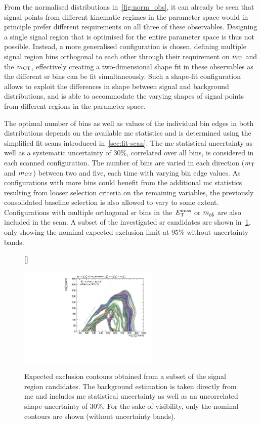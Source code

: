 From the normalised distributions in~\cref{fig:norm_obs}, it can already be seen that signal points from different kinematic regimes in the parameter space would in principle prefer different requirements on all three of these observables. Designing a single signal region that is optimised for the entire parameter space is thus not possible. Instead, a more generalised configuration is chosen, defining multiple signal region bins orthogonal to each other through their requirement on $m_{\textrm{T}}$ and the $m_{\textrm{CT}}$, effectively creating a two-dimensional shape fit in these observables as the different \gls{sr} bins can be fit simultaneously. Such a shape-fit configuration allows to exploit the differences in shape between signal and background distributions, and is able to accommodate the varying shapes of signal points from different regions in the parameter space.

The optimal number of bins as well as values of the individual bin edges in both distributions depends on the available \gls{mc} statistics and is determined using the simplified fit scans introduced in~\cref{sec:fit-scan}. The \gls{mc} statistical uncertainty as well as a systematic uncertainty of 30\%, correlated over all bins, is considered in each scanned configuration. The number of bins are varied in each direction ($m_{\textrm{T}}$ and $m_{\textrm{CT}}$) between two and five, each time with varying bin edge values. As configurations with more bins could benefit from the additional \gls{mc} statistics resulting from looser selection criteria on the remaining variables, the previously consolidated baseline selection is also allowed to vary to some extent. Configurations with multiple orthogonal \gls{sr} bins in the $E_{\textrm{T}}^{\textrm{miss}}$ or $m_{b\bar{b}}$ are also included in the scan. A subset of the investigated \gls{sr} candidates are shown in~\cref{fig:fit_scan_optimisation}, only showing the nominal expected exclusion limit at 95\% without uncertainty bands.

\begin{figure}
[\FBwidth]
{\caption{Expected exclusion contours obtained from a subset of the signal region candidates. The background estimation is taken directly from \gls{mc} and includes \gls{mc} statistical uncertainty as well as an uncorrelated shape uncertainty of 30\%. For the sake of visibility, only the nominal contours are shown (without uncertainty bands).}\label{fig:fit_scan_optimisation}}
{\includegraphics[width=0.6\textwidth]{HF/batch_compare}}
\end{figure}

